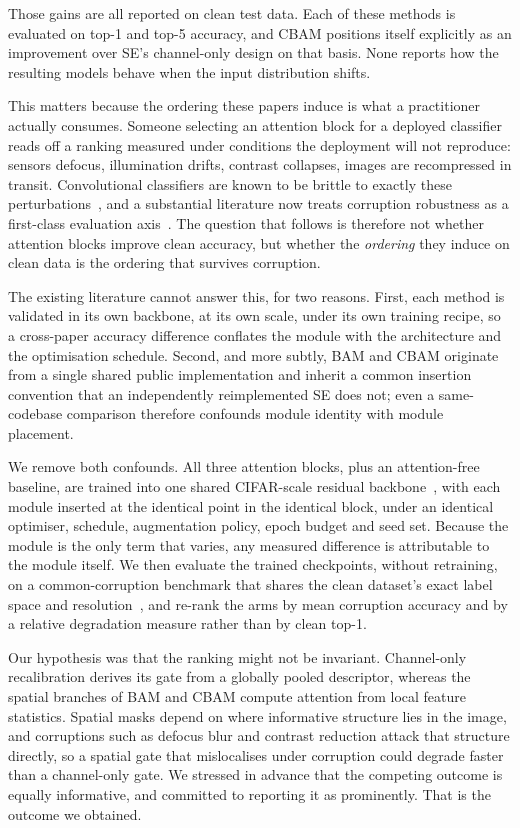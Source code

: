 \documentclass[10pt]{article}
\begin{document}
Those gains are all reported on clean test data. Each of these methods is
evaluated on top-1 and top-5 accuracy, and CBAM positions itself explicitly as
an improvement over SE's channel-only design on that basis. None reports how
the resulting models behave when the input distribution shifts.

This matters because the ordering these papers induce is what a practitioner
actually consumes. Someone selecting an attention block for a deployed
classifier reads off a ranking measured under conditions the deployment will
not reproduce: sensors defocus, illumination drifts, contrast collapses, images
are recompressed in transit. Convolutional classifiers are known to be brittle
to exactly these
perturbations~\citep{hendrycks2019benchmarking,geirhos2019imagenet}, and a
substantial literature now treats corruption robustness as a first-class
evaluation axis~\citep{hendrycks2020augmix}. The question that follows is
therefore not whether attention blocks improve clean accuracy, but whether the
\emph{ordering} they induce on clean data is the ordering that survives
corruption.

The existing literature cannot answer this, for two reasons. First, each method
is validated in its own backbone, at its own scale, under its own training
recipe, so a cross-paper accuracy difference conflates the module with the
architecture and the optimisation schedule. Second, and more subtly, BAM and
CBAM originate from a single shared public implementation and inherit a common
insertion convention that an independently reimplemented SE does not; even a
same-codebase comparison therefore confounds module identity with module
placement.

We remove both confounds. All three attention blocks, plus an attention-free
baseline, are trained into one shared CIFAR-scale residual
backbone~\citep{he2016deep}, with each module inserted at the identical point in
the identical block, under an identical optimiser, schedule, augmentation
policy, epoch budget and seed set. Because the module is the only term that
varies, any measured difference is attributable to the module itself. We then
evaluate the trained checkpoints, without retraining, on a common-corruption
benchmark that shares the clean dataset's exact label space and
resolution~\citep{hendrycks2019benchmarking,krizhevsky2009learning}, and re-rank
the arms by mean corruption accuracy and by a relative degradation measure
rather than by clean top-1.

Our hypothesis was that the ranking might not be invariant. Channel-only
recalibration derives its gate from a globally pooled descriptor, whereas the
spatial branches of BAM and CBAM compute attention from local feature
statistics. Spatial masks depend on where informative structure lies in the
image, and corruptions such as defocus blur and contrast reduction attack that
structure directly, so a spatial gate that mislocalises under corruption could
degrade faster than a channel-only gate. We stressed in advance that the
competing outcome is equally informative, and committed to reporting it as
prominently. That is the outcome we obtained.
\end{document}
